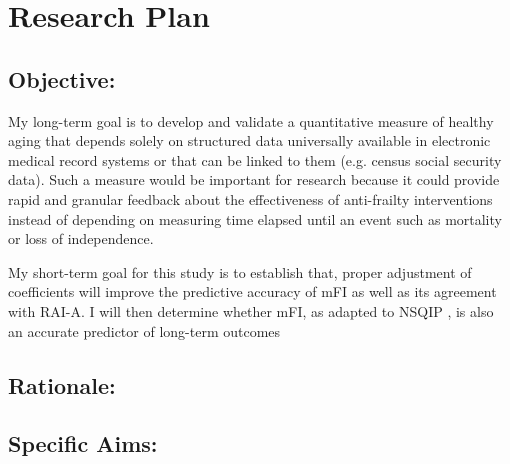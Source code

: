 \section{Research Plan }\label{research-plan}


\subsection{Objective:}\label{objective}
  
My long-term goal is to develop and validate a quantitative measure of healthy aging that depends solely on structured data universally available in electronic medical record systems or that can be linked to them (e.g. census social security data). Such a measure would be important for research because it could provide rapid and granular feedback about the effectiveness of anti-frailty interventions instead of depending on measuring time elapsed until an event such as mortality or loss of independence. 

My short-term goal for this study is to establish that, proper adjustment of coefficients will improve the predictive accuracy of mFI as well as its agreement with RAI-A. I will then determine whether mFI, as adapted to NSQIP , is also an accurate predictor of long-term outcomes 

\subsection{Rationale:}\label{rationale}

\subsection{Specific Aims:}\label{specific-aims}
